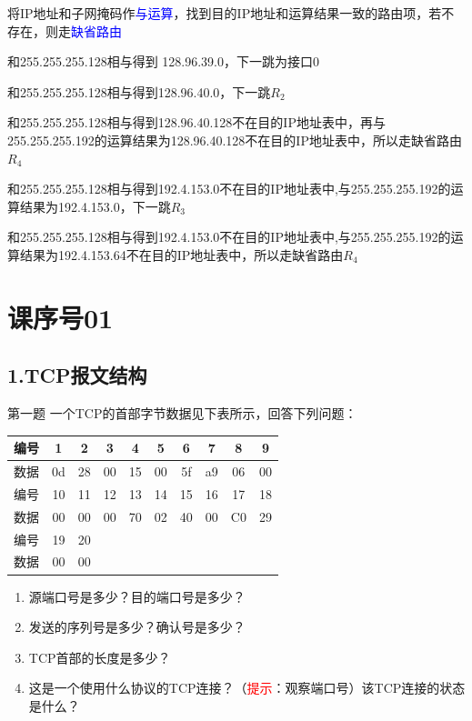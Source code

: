 \documentclass[presentation]{beamer}
\begin{document}
\begin{frame}
	\begin{block}{}
	将IP地址和子网掩码作\textcolor{blue}{与运算}，找到目的IP地址和运算结果一致的路由项，若不存在，则走\textcolor{blue}{缺省路由}
	\end{block}
	\begin{description}
		\item<2->[128.96.39.10] 和255.255.255.128相与得到	128.96.39.0，下一跳为接口$0$
		\item<3->[128.96.40.12] 和255.255.255.128相与得到128.96.40.0，下一跳$R_2$
		\item<4->[128.96.40.151]和255.255.255.128相与得到128.96.40.128不在目的IP地址表中，再与255.255.255.192的运算结果为128.96.40.128不在目的IP地址表中，所以走缺省路由$R_4$
		\item<5->[192.4.153.17]和255.255.255.128相与得到192.4.153.0不在目的IP地址表中,与255.255.255.192的运算结果为192.4.153.0，下一跳$R_3$
		\item<6->[192.4.153.90]和255.255.255.128相与得到192.4.153.0不在目的IP地址表中,与255.255.255.192的运算结果为192.4.153.64不在目的IP地址表中，所以走缺省路由$R_4$
	\end{description}
\end{frame}

\section{课序号01}
\subsection{1.TCP报文结构}
\begin{frame}{第一题}
	一个TCP的首部字节数据见下表所示，回答下列问题：
	\begin{table}
		\begin{tabular}{|c|c|c|c|c|c|c|c|c|c|}
			\hline
			编号&	1& 	2&	3&	4&	5& 6&	7&	8&	9\\
			\hline
			数据&	0d&	28&	00&	15&	00&	5f&	a9&	06&	00\\
			\hline
			编号&	10&	11&	12&	13&	14&	15&	16&	17&	18\\
			\hline
			数据&	00&	00&	00&	70&	02&	40&	00&	C0&	29\\
			\hline
			编号&	19&	20& & & & & & & \\ 	
			\hline						
			数据&	00&	00&	& &　& & & & \\	
			\hline						
		\end{tabular}
	\end{table}
	\begin{enumerate}
		\item 源端口号是多少？目的端口号是多少？
		\item 发送的序列号是多少？确认号是多少？
		\item TCP首部的长度是多少？
		\item 这是一个使用什么协议的TCP连接？（\textcolor{red}{提示}：观察端口号）该TCP连接的状态是什么？	
	\end{enumerate}
\end{frame}
\end{document}
